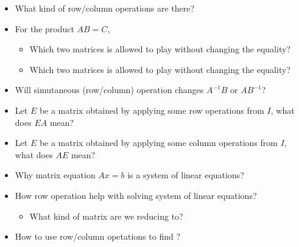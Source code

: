 
\subtitle{Column/Row operations}\maketitle
{}

\begin{itemize}
\item What  kind of row/column operations are there?
\item For the product $AB=C$, 
	\begin{itemize}
		\item Which two matrices is allowed to play  without changing the equality?
		\item Which two matrices is allowed to play  without changing the equality?
	\end{itemize}
\item Will simutaneous (row/column) operation changes $A^{-1}B$ or $AB^{-1}$?
\item Let $E$ be a matrix obtained by applying some row operations from $I$, what does $EA$ mean?
\item Let $E$ be a matrix obtained by applying some column operations from $I$, what does $AE$ mean?
\item Why matrix equation $Ax=b$ is a system of linear equations?
\item How row operation help with solving system of linear equations? \begin{itemize}\item What kind of matrix are we reducing to?\end{itemize}
\item How to use row/column opetations to find ?
\end{itemize}

